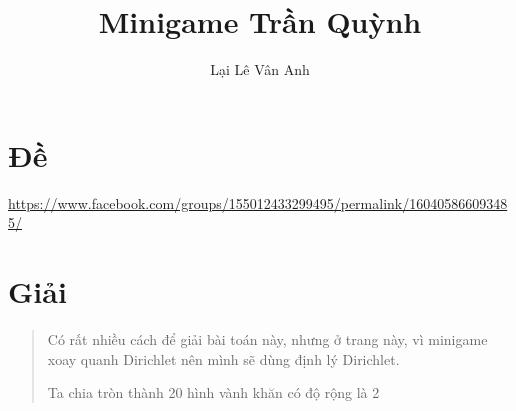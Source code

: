 \documentclass[10pt]{article}
\title{Minigame Trần Quỳnh}
\author{Lại Lê Vân Anh}
\begin{document}
\maketitle
\section*{Đề}
\url{https://www.facebook.com/groups/155012433299495/permalink/160405866093485/}
\section*{Giải}
\begin{quote}
    Có rất nhiều cách để giải bài toán này, nhưng ở trang này, vì minigame xoay quanh Dirichlet nên mình sẽ dùng định lý Dirichlet.

    Ta chia tròn thành 20 hình vành khăn có độ rộng là 2

\end{quote}
\end{document}
